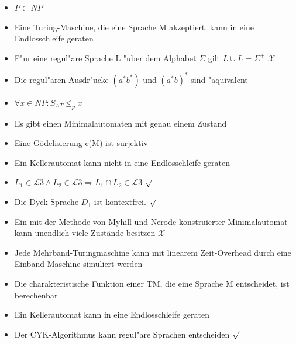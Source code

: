 \documentclass[11pt, a4paper]{scrartcl}
\newcommand{\gr}[1]{{\color{Green}#1}}
\newcommand{\rd}[1]{{\color{Red}#1}}
\begin{document}
\begin{itemize}
    \item $P \subset NP$ 
    \item Eine Turing-Maschine, die eine Sprache M akzeptiert, kann in eine Endlosschleife geraten
    \item F"ur eine regul"are Sprache L "uber dem Alphabet $\Sigma$ gilt $L \cup \overline{L} = \Sigma^+$ \rd{$\mathcal{X}$}
    \item Die regul"aren Ausdr"ucke $(a^*b^*)$ und $(a^*b)^*$ sind "aquivalent
    \item $\forall x \in NP : S_{AT} \leq_p x$
    \item Es gibt einen Minimalautomaten mit genau einem Zustand
    \item Eine Gödelisierung c(M) ist surjektiv
    \item Ein Kellerautomat kann nicht in eine Endlosschleife geraten
    \item $L_1 \in \mathcal{L}3 \land L_2 \in \mathcal{L}3 \Rightarrow L_1 \cap L_2 \in \mathcal{L}3$  \gr{$\surd $}
    \item Die Dyck-Sprache $D_1$ ist kontextfrei. \gr{$\surd $}
    \item Ein mit der Methode von Myhill und Nerode konstruierter Minimalautomat kann unendlich viele Zustände besitzen \rd{$\mathcal{X}$}
    \item Jede Mehrband-Turingmaschine kann mit linearem Zeit-Overhead durch eine Einband-Maschine simuliert werden
    \item Die charakteristische Funktion einer TM, die eine Sprache M entscheidet, ist berechenbar
    \item Ein Kellerautomat kann in eine Endlosschleife geraten
    \item Der CYK-Algorithmus kann regul"are Sprachen entscheiden \gr{$\surd $}
\end{itemize}
\end{document}
